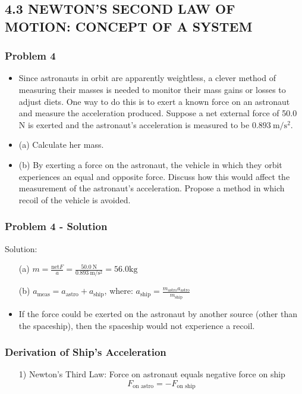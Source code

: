\documentclass{beamer}
\begin{document}
\begin{}

\section{4.3 NEWTON'S SECOND LAW OF MOTION: CONCEPT OF A SYSTEM}

\begin{frame}
\frametitle{Problem 4}
\begin{itemize}
    \item Since astronauts in orbit are apparently weightless, a clever method of measuring their masses is needed to monitor their mass gains or losses to adjust diets. One way to do this is to exert a known force on an astronaut and measure the acceleration produced. Suppose a net external force of 50.0 N is exerted and the astronaut's acceleration is measured to be $0.893 \mathrm{~m} / \mathrm{s}^{2}$.
    \item (a) Calculate her mass.
    \item (b) By exerting a force on the astronaut, the vehicle in which they orbit experiences an equal and opposite force. Discuss how this would affect the measurement of the astronaut's acceleration. Propose a method in which recoil of the vehicle is avoided.
\end{itemize}
\end{frame}

\begin{frame}
\frametitle{Problem 4 - Solution}
Solution:
\begin{itemize}
    \item[(a)] $m = \frac{\text{net} F}{a} = \frac{50.0 \mathrm{~N}}{0.893 \mathrm{~m} / \mathrm{s}^{2}} = 56.0 \mathrm{kg}$
    \item[(b)] $a_{\text{meas}} = a_{\text{astro}} + a_{\text{ship}}$, where: $a_{\text{ship}} = \frac{m_{\text{astro}} a_{\text{astro}}}{m_{\text{ship}}}$
    \item If the force could be exerted on the astronaut by another source (other than the spaceship), then the spaceship would not experience a recoil.
\end{itemize}
\end{frame}

\begin{frame}
\frametitle{Derivation of Ship's Acceleration}
\small
\begin{itemize}
    \item[1)] Newton's Third Law: Force on astronaut equals negative force on ship
    $$F_{\text{on astro}} = -F_{\text{on ship}}$$
    

\end{itemize}
\end{frame}
\end{}
\end{document}

